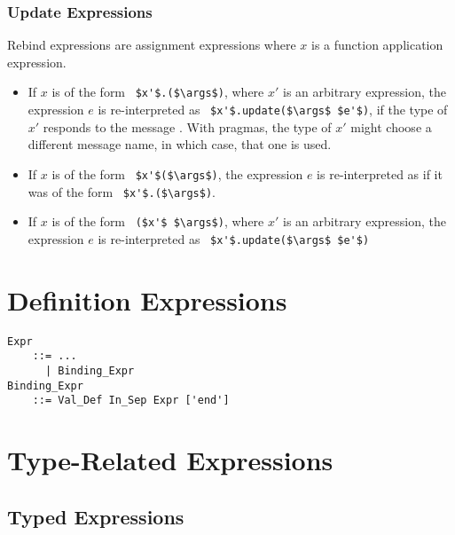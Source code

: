 \subsubsection{Update Expressions}

Rebind expressions are assignment expressions where $x$ is a function application expression. 

\begin{itemize}
  \item If $x$ is of the form ~\lstinline!$x'$.($\args$)!, where $x'$ is an arbitrary expression, the expression $e$ is re-interpreted as ~\lstinline!$x'$.update($\args$ $e'$)!, if the type of $x'$ responds to the message . With pragmas, the type of $x'$ might choose a different message name, in which case, that one is used.
  \item If $x$ is of the form ~\lstinline!$x'$($\args$)!, the expression $e$ is re-interpreted as if it was of the form ~\lstinline!$x'$.($\args$)!. 
  \item If $x$ is of the form ~\lstinline!($x'$ $\args$)!, where $x'$ is an arbitrary expression, the expression $e$ is re-interpreted as ~\lstinline!$x'$.update($\args$ $e'$)!
\end{itemize}






\section{Definition Expressions}
\label{sec:def-expressions}

\grammar\begin{lstlisting}
Expr 
    ::= ...
      | Binding_Expr
Binding_Expr 
    ::= Val_Def In_Sep Expr ['end']
\end{lstlisting}





\section{Type-Related Expressions}





\subsection{Typed Expressions}
\label{sec:typed-expressions}

